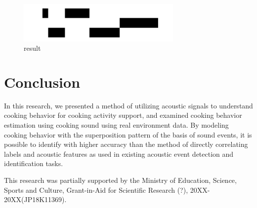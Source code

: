 \documentclass[sigchi]{acmart}
\begin{document}
\begin{figure}[h]
  \centering
  \includegraphics[width=8cm]{fig/N63_m4_smoothed.pdf}
  \caption{result}
  \Description{}
  \label{baseine_timeline_smoothed_result}
\end{figure}


\section{Conclusion}
In this research, we presented a method of utilizing acoustic signals to understand cooking behavior for cooking activity support, and examined cooking behavior estimation using cooking sound using real environment data.
By modeling cooking behavior with the superposition pattern of the basis of sound events, it is possible to identify with higher accuracy than the method of directly correlating labels and acoustic features as used in existing acoustic event detection and identification tasks.


\begin{acks}
This research was partially supported by the Ministry of Education, Science, Sports and Culture, Grant-in-Aid for Scientific Research (?), 20XX-20XX(JP18K11369).
\end{acks}

%



%
\end{document}
